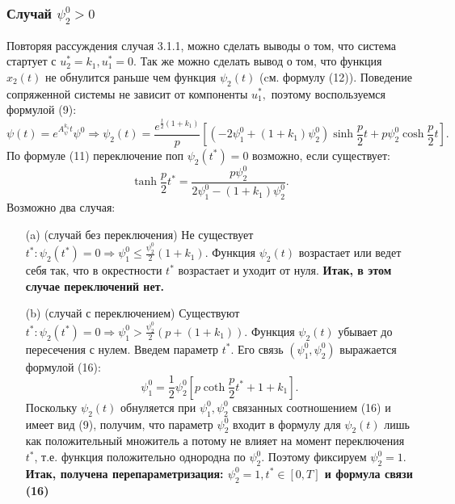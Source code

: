 \documentclass[11pt]{article}
\begin{document}
{{\subsubsection{Случай $\psi_2^0 > 0$}
Повторяя рассуждения случая 3.1.1, можно сделать выводы о том, что система стартует с $u_2^* = k_1,u_1^* = 0.$ Так же можно сделать вывод о том, что функция $x_2(t)$ не обнулится раньше чем функция $\psi_2(t)$ (cм. формулу (12)).
\newline 
Поведение сопряженной системы не зависит от компоненты $u_1^*,$ поэтому воспользуемся формулой (9):
\[\psi(t) = e^{A^{k_1}_\psi t}\psi^0 \Rightarrow \psi_2(t) = \frac{e^{\frac{t}{2}(1 + k_1)}}{p}[(-2\psi_1^0 + (1+k_1)\psi_2^0)\sinh\frac{p}{2}t + p\psi_2^0\cosh\frac{p}{2}t].\]
По формуле (11) переключение поп $\psi_2(t^*) = 0$ возможно, если существует:
\[ \tanh\frac{p}{2}t^* = \frac{p\psi_2^0}{2\psi_1^0 - (1 + k_1)\psi_2^0}. \]
Возможно два случая:
\begin{itemize}
	\item [(a)]{(случай без переключения)
	\newline
	Не существует $t^*:\psi_2(t^*) = 0 \Rightarrow \psi_1^0 \leq \frac{\psi_2^0}{2}(1 + k_1).$ Функция $\psi_2(t)$ возрастает или ведет себя так, что в окрестности $t^*$ возрастает и уходит от нуля.
	\newline
	\textbf{Итак, в этом случае переключений нет.}
 }
	\item [(b)]{(случай с переключением)
	\newline
		Существуют $t^*:\psi_2(t^*) = 0 \Rightarrow \psi_1^0 > \frac{\psi_2^0}{2}(p + (1 + k_1)).$ Функция $\psi_2(t)$ убывает до пересечения с нулем. Введем параметр $t^*$. Его связь $(\psi_1^0,\psi_2^0)$ выражается формулой (16):
	\[ \psi_1^0 = \frac{1}{2}\psi_2^0[p\coth\frac{p}{2}t^* + 1 + k_1].\]
	Поскольку $\psi_2(t)$ обнуляется при $\psi_1^0,\psi_2^0$ связанных соотношением (16) и имеет вид (9), получим, что параметр $\psi_2^0$ входит в формулу для $\psi_2(t)$ лишь как положительный множитель а потому не влияет на момент переключения $t^*$, т.е. функция положительно однородна по $\psi_2^0.$ Поэтому фиксируем $\psi_2^0 = 1.$
	\newline
	\textbf{Итак, получена перепараметризация: $\psi_2^0 = 1, t^* \in [0, T]$ и формула связи (16)}	
}
\end{itemize}
}}
\end{document}
